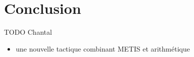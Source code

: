 \section{Conclusion}

TODO Chantal

\begin{itemize}
\item une nouvelle tactique combinant METIS et arithmétique
\end{itemize}
